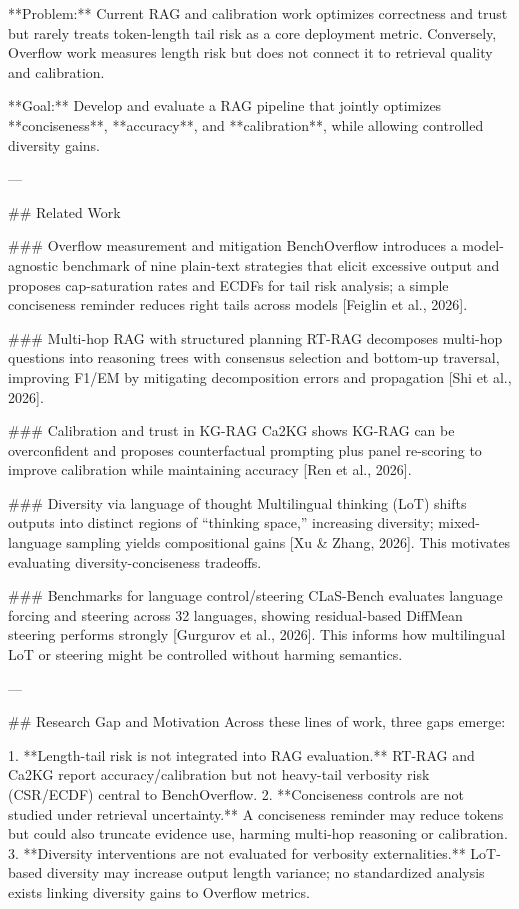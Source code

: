 **Problem:** Current RAG and calibration work optimizes correctness and trust but rarely treats token-length tail risk as a core deployment metric. Conversely, Overflow work measures length risk but does not connect it to retrieval quality and calibration.

**Goal:** Develop and evaluate a RAG pipeline that jointly optimizes **conciseness**, **accuracy**, and **calibration**, while allowing controlled diversity gains.

---

## Related Work  

### Overflow measurement and mitigation  
BenchOverflow introduces a model-agnostic benchmark of nine plain-text strategies that elicit excessive output and proposes cap-saturation rates and ECDFs for tail risk analysis; a simple conciseness reminder reduces right tails across models [Feiglin et al., 2026].

### Multi-hop RAG with structured planning  
RT-RAG decomposes multi-hop questions into reasoning trees with consensus selection and bottom-up traversal, improving F1/EM by mitigating decomposition errors and propagation [Shi et al., 2026].

### Calibration and trust in KG-RAG  
Ca2KG shows KG-RAG can be overconfident and proposes counterfactual prompting plus panel re-scoring to improve calibration while maintaining accuracy [Ren et al., 2026].

### Diversity via language of thought  
Multilingual thinking (LoT) shifts outputs into distinct regions of “thinking space,” increasing diversity; mixed-language sampling yields compositional gains [Xu & Zhang, 2026]. This motivates evaluating diversity-conciseness tradeoffs.

### Benchmarks for language control/steering  
CLaS-Bench evaluates language forcing and steering across 32 languages, showing residual-based DiffMean steering performs strongly [Gurgurov et al., 2026]. This informs how multilingual LoT or steering might be controlled without harming semantics.

---

## Research Gap and Motivation  
Across these lines of work, three gaps emerge:

1. **Length-tail risk is not integrated into RAG evaluation.** RT-RAG and Ca2KG report accuracy/calibration but not heavy-tail verbosity risk (CSR/ECDF) central to BenchOverflow.  
2. **Conciseness controls are not studied under retrieval uncertainty.** A conciseness reminder may reduce tokens but could also truncate evidence use, harming multi-hop reasoning or calibration.  
3. **Diversity interventions are not evaluated for verbosity externalities.** LoT-based diversity may increase output length variance; no standardized analysis exists linking diversity gains to Overflow metrics.

